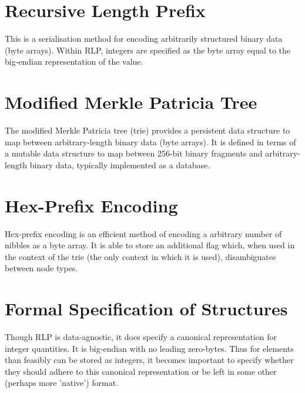 \documentclass[9pt,oneside]{amsart}
\begin{document}
\section{Recursive Length Prefix}\label{app:rlp}
This is a serialisation method for encoding arbitrarily structured binary data (byte arrays). Within RLP, integers are specified as the byte array equal to the big-endian representation of the value.




\section{Modified Merkle Patricia Tree}\label{app:trie}
The modified Merkle Patricia tree (trie) provides a persistent data structure to map between arbitrary-length binary data (byte arrays). It is defined in terms of a mutable data structure to map between 256-bit binary fragments and arbitrary-length binary data, typically implemented as a database.

\section{Hex-Prefix Encoding}\label{app:hexprefix}
Hex-prefix encoding is an efficient method of encoding a arbitrary number of nibbles as a byte array. It is able to store an additional flag which, when used in the context of the trie (the only context in which it is used), disambiguates between node types.

\section{Formal Specification of Structures}
Though RLP is data-agnostic, it does specify a canonical representation for integer quantities. It is big-endian with no leading zero-bytes. Thus for elements than feasibly can be stored as integers, it becomes important to specify whether they should adhere to this canonical representation or be left in some other (perhaps more 'native') format.
\end{document}
